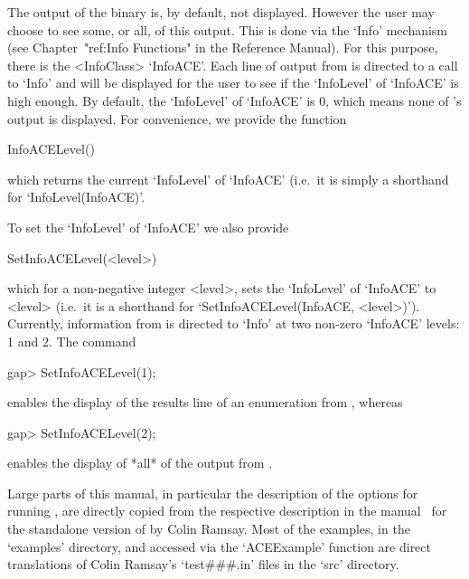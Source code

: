 
The output of the {\ACE} binary is, by default, not displayed. However
the user may choose to see some, or all, of this output. This is  done
via the `Info' mechanism  (see  Chapter~"ref:Info  Functions"  in  the
{\GAP} Reference Manual). For this purpose, there is  the  <InfoClass>
`InfoACE'. Each line of output from {\ACE} is directed to  a  call  to
`Info' and will be displayed for the user to see if the `InfoLevel' of
`InfoACE' is high enough. By default, the `InfoLevel' of `InfoACE'  is
0, which means none of {\ACE}'s output is displayed. For  convenience,
we provide the function

\>InfoACELevel()

which returns the current `InfoLevel' of `InfoACE' (i.e.~it is  simply
a shorthand for `InfoLevel(InfoACE)'.

To set the `InfoLevel' of `InfoACE' we also provide

\>SetInfoACELevel(<level>)

which for a non-negative integer  <level>,  sets  the  `InfoLevel'  of
`InfoACE'    to    <level>    (i.e.~it    is    a    shorthand     for
`SetInfoACELevel(InfoACE,  <level>)').  Currently,  information   from
{\ACE} is directed to `Info' at two non-zero `InfoACE' levels:  1  and
2. The command

\begintt
gap> SetInfoACELevel(1);
\endtt

enables the display of the results line of an enumeration from {\ACE},
whereas

\begintt
gap> SetInfoACELevel(2);
\endtt

enables the display of *all* of the output from {\ACE}.


Large parts of this manual,  in  particular  the  description  of  the
options for running {\ACE}, are directly copied  from  the  respective
description in the manual~\cite{Ram99} for the standalone  version  of
{\ACE} by Colin Ramsay.  Most  of  the  examples,  in  the  `examples'
directory, and accessed  via  the  `ACEExample'  function  are  direct
translations  of  Colin  Ramsay's `test\#\#\#.in' files  in  the `src'
directory.


